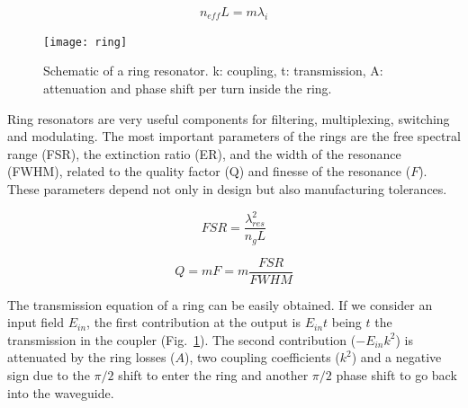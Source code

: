 \documentclass[journal]{IEEEtran}
\begin{document}

\begin{equation}
	n_{eff}  L = m \lambda_i
	\label{eq:resonanceCondition}
\end{equation} 

\begin{figure}[htb]
    \centering
    \texttt{[image: ring]}
    \caption{Schematic of a ring resonator. k: coupling, t: transmission, A: attenuation and phase shift per turn inside the ring.}
    \label{fig:ringSchematic}
\end{figure}


Ring resonators are very useful components for filtering, multiplexing, switching and modulating. The most important parameters of the rings are the free spectral range (FSR), the extinction ratio (ER), and the width of the resonance (FWHM), related to the quality factor (Q) and finesse of the resonance ($F$). These parameters depend not only in design but also manufacturing tolerances.

\begin{equation}
	FSR=\frac{\lambda_{res}^2}{n_gL}
\end{equation} 

\begin{equation}
	Q=mF=m\frac{FSR}{FWHM}
\end{equation} 

The transmission equation of a ring can be easily obtained. If we consider an input field $E_{in}$, the first contribution at the output is $E_{in} t$ being $t$ the transmission in the coupler (Fig.~\ref{fig:ringSchematic}). The second contribution ($-E_{in} k^2$) is attenuated by the ring losses ($A$), two coupling coefficients ($k^2$) and a negative sign due to the $\pi/2$ shift to enter the ring and another $\pi/2$ phase shift to go back into the waveguide.
\end{document}
